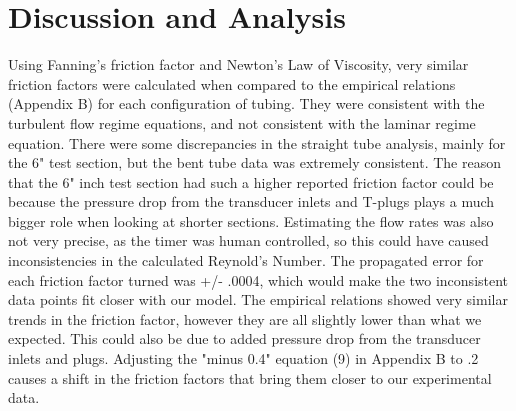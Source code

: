 \documentclass{article}
\begin{document}
\section*{Discussion and Analysis}
Using Fanning’s friction factor and Newton’s Law of Viscosity, very similar friction factors were calculated when compared to the empirical relations (Appendix B) for each configuration of tubing.
\linebreak
\linebreak
They were consistent with the turbulent flow regime equations, and not consistent with the laminar regime equation. There were some discrepancies in the straight tube analysis, mainly for the 6" test section, but the bent tube data was extremely consistent. The reason that the 6" inch test section had such a higher reported friction factor could be because the pressure drop from the transducer inlets and T-plugs plays a much bigger role when looking at shorter sections. Estimating the flow rates was also not very precise, as the timer was human controlled, so this could have caused inconsistencies in the calculated Reynold's Number. The propagated error for each friction factor turned was +/- .0004, which would make the two inconsistent data points fit closer with our model. The empirical relations showed very similar trends in the friction factor, however they are all slightly lower than what we expected. This could also be due to added pressure drop from the transducer inlets and plugs. Adjusting the "minus 0.4"  equation (9) in Appendix B to .2 causes a shift in the friction factors that bring them closer to our experimental data. \linebreak
\linebreak
\end{document}
